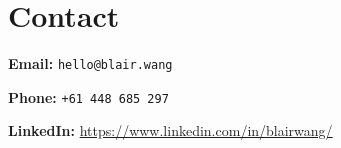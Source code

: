 \section*{Contact}
\begin{myitemize}
	\item \textbf{Email:} \texttt{hello@blair.wang}
	\item \textbf{Phone:} \texttt{+61 448 685 297}
	\item \textbf{LinkedIn:} \url{https://www.linkedin.com/in/blairwang/}
\end{myitemize}